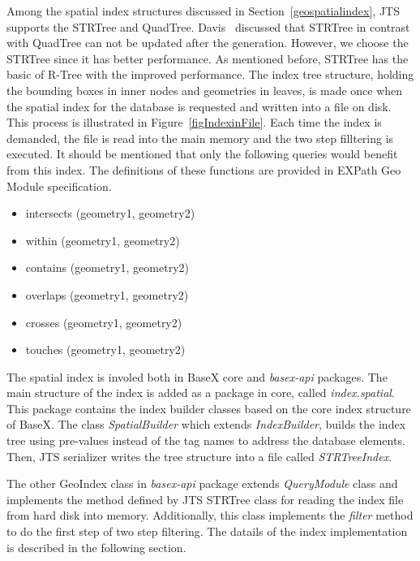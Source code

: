 \documentclass[a4paper,12pt]{article}
\begin{document}
Among the spatial index structures discussed in Section~\ref{geospatialindex}, JTS supports the STRTree and QuadTree. Davis~\cite{jts-presentation} discussed that STRTree in contrast with QuadTree can not be updated after the generation. However, we choose the STRTree since it has better performance. As mentioned before, STRTree has the basic of R-Tree with the improved performance. The index tree structure, holding the bounding boxes in inner nodes and geometries in leaves, is made once when the spatial index for the database is requested and written into a file on disk. This process is illustrated in Figure~\ref{figIndexinFile}. Each time the index is demanded, the file is read into the main memory and the two step filltering is executed. It should be mentioned that only the following queries would benefit from this index. The definitions of these functions are provided in EXPath Geo Module specification.
\begin{itemize}
\item intersects (geometry1, geometry2)
\item within (geometry1, geometry2)
\item contains (geometry1, geometry2)
\item overlaps (geometry1, geometry2)
\item crosses (geometry1, geometry2)
\item touches (geometry1, geometry2)
\end{itemize}

The spatial index is involed both in BaseX core and \textit{basex-api} packages. The main structure of the index is added as a package in core, called \textit{index.spatial}. This package contains the index builder classes based on the core index structure of BaseX. The class \textit{SpatialBuilder} which extends \textit{IndexBuilder}, builds the index tree using pre-values instead of the tag names to address the database elements. Then, JTS serializer writes the tree structure into a file called \textit{STRTreeIndex}.

The other GeoIndex class in \textit{basex-api} package extends \textit{QueryModule} class and implements the method defined by JTS STRTree class for reading the index file from hard disk into memory. Additionally, this class implements the \textit{filter} method to do the first step of two step filtering. The datails of the index implementation is described in the following section.
 
\end{document}
